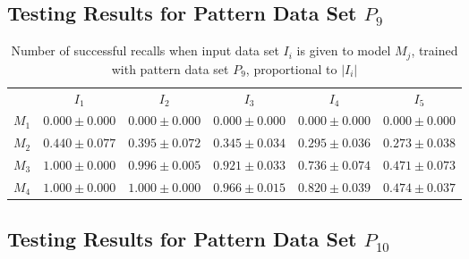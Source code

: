 \documentclass[anon]{CI}
\begin{document}
		\subsection{Testing Results for Pattern Data Set $P_{9}$}
		
		
		\begin{table}[H]
			\centering
			\def\arraystretch{1.5}
			\footnotesize
			\begin{tabular}{cccccc}
				
				& $I_{1}$  & $I_{2}$  & $I_{3}$  & $I_{4}$  & $I_{5}$ \\ \cline{2-6}
				$M_{1}$  & $0.000\pm0.000$  & $0.000\pm0.000$  & $0.000\pm0.000$  & $0.000\pm0.000$  & $0.000\pm0.000$ \\
				$M_{2}$  & $0.440\pm0.077$  & $0.395\pm0.072$  & $0.345\pm0.034$  & $0.295\pm0.036$  & $0.273\pm0.038$ \\
				$M_{3}$  & $1.000\pm0.000$  & $0.996\pm0.005$  & $0.921\pm0.033$  & $0.736\pm0.074$  & $0.471\pm0.073$ \\
				$M_{4}$  & $1.000\pm0.000$  & $1.000\pm0.000$  & $0.966\pm0.015$  & $0.820\pm0.039$  & $0.474\pm0.037$ \\
				
			\end{tabular}
			\caption{Number of successful recalls when input data set $I_i$ is given to model $M_j$, trained with pattern data set $P_{9}$, proportional to $\left|I_i\right|$}
		\end{table}
		
		\subsection{Testing Results for Pattern Data Set $P_{10}$}
		
		
\end{document}
